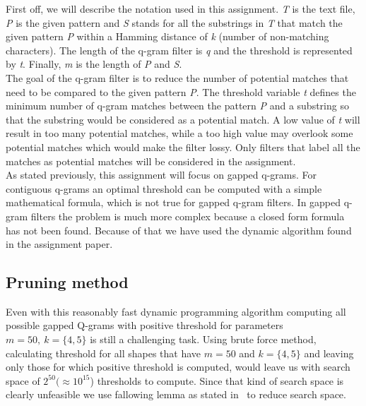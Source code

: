 \documentclass[paper=a4, fontsize=11pt]{scrartcl} %
\numberwithin{equation}{section} %
\numberwithin{figure}{section} %
\numberwithin{table}{section} %
\begin{document}
First off, we will describe the notation used in this assignment. \textit{T} is the text file, \textit{P} is the given pattern and \textit{S} stands 
for all the substrings in \textit{T} that match the given pattern \textit{P} within a Hamming distance of \textit{k} (number of non-matching characters). 
The length of the q-gram filter is \textit{q} and the threshold is represented by \textit{t}. Finally, \textit{m} is the length of \textit{P} and \textit{S}. \\
The goal of the q-gram filter is to reduce the number of potential matches that need to be compared to the given pattern \textit{P}. 
The threshold variable \textit{t} defines the minimum number of q-gram matches between the pattern \textit{P} and 
a substring so that the substring would be considered as a potential match. A low value of \textit{t} will result in too many potential matches, 
while a too high value may overlook some potential matches which would make the filter lossy. Only filters that label all the matches as 
potential matches will be considered in the assignment.\\
As stated previously, this assignment will focus on gapped q-grams. For contiguous q-grams an optimal threshold can be computed with a
simple mathematical formula, which is not true for gapped q-gram filters. In gapped q-gram filters the problem is much more complex
because a closed form formula has not been found. Because of that we have used the dynamic algorithm found in the assignment paper.




\subsection{Pruning method}
\label{subsec:pruning}

Even with this reasonably fast dynamic programming algorithm computing all
possible gapped Q-grams with positive threshold for parameters $m=50,\
k=\{4,5\}$ is still a challenging task. Using brute force method, calculating
threshold for all shapes that have $m=50$ and $k=\{4,5\}$ and leaving only
those for which positive threshold is computed, would leave us with search space
of $2^{50} (\approx 10^{15}$) thresholds to compute. Since that kind of search
space is clearly unfeasible we use fallowing lemma as stated
in~\cite{njihovPaper} to reduce search space.
\end{document}
